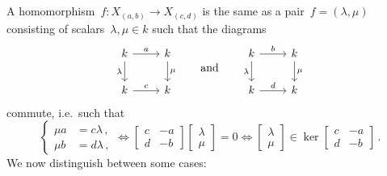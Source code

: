 \section{}

A homomorphism~$f \colon X_{(a,b)} \to X_{(c,d)}$ is the same as a pair~$f = (\lambda, \mu)$ consisting of scalars~$\lambda, \mu \in k$ such that the diagrams
\[
  \begin{tikzcd}
      k
      \arrow{r}[above]{a}
      \arrow{d}[left]{\lambda}
    & k
      \arrow{d}[right]{\mu}
    \\
      k
      \arrow{r}[above]{c}
    & k
  \end{tikzcd}
  \qquad\text{and}\qquad
  \begin{tikzcd}
      k
      \arrow{r}[above]{b}
      \arrow{d}[left]{\lambda}
    & k
      \arrow{d}[right]{\mu}
    \\
      k
      \arrow{r}[above]{d}
    & k
  \end{tikzcd}
\]
commute, i.e.\ such that
\[
  \left\{
    \begin{aligned}
      \mu a &= c \lambda \,, \\
      \mu b &= d \lambda \,,
    \end{aligned}
  \right.
  \iff
  \begin{bmatrix}
    c & -a  \\
    d & -b
  \end{bmatrix}
  \begin{bmatrix}
    \lambda \\
    \mu
  \end{bmatrix}
  = 0
  \iff
  \begin{bmatrix}
    \lambda \\
    \mu
  \end{bmatrix}
  \in \ker
  \begin{bmatrix}
    c & -a  \\
    d & -b
  \end{bmatrix} \,.
\]
We now distinguish between some cases:
